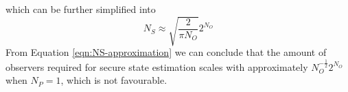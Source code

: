 which can be further simplified into
\begin{equation}\label{eqn:NS-approximation}
    N_S \approx \sqrt{\frac{2}{\pi N_O}}2^{N_O}
\end{equation}
From Equation \eqref{eqn:NS-approximation} we can conclude that the amount of observers required for secure state estimation scales with approximately $N_O^{-\frac{1}{2}}2^{N_O}$ when $N_P=1$, which is not favourable.